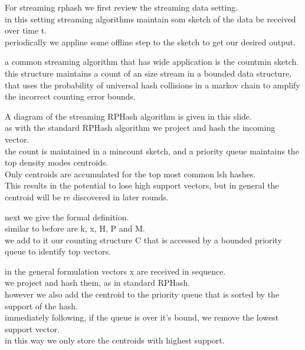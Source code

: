 \documentclass{beamer}
\begin{document}
\begin{frame}[plain]
For streaming rphash we first review the streaming data setting. \\

in this setting
streaming algorithms maintain som sketch of the data be received over time t.\\

periodically we appline some offline step to the sketch to get our desired output.
\end{frame}

\begin{frame}[plain]
a common streaming algorithm that has wide application is the countmin sketch.\\

this structure maintains a count of an size stream in a bounded data structure,
that uses the probability of universal hash collisions in a markov chain to
amplify the incorrect counting error bounds.
\end{frame}

\begin{frame}[plain]
A diagram of the streaming RPHash algorithm is given in this slide.\\

as with the
standard RPHash algorithm we project and hash the incoming vector.\\

the count
is maintained in a mincount sketch, and a priority queue maintains the top
density modes centroids. \\

Only centroids are accumulated for the top most common
lsh hashes. \\

This results in the potential to lose high support vectors, but in
general the centroid will be re discovered in later rounds.
\end{frame}

\begin{frame}[plain]
next we give the formal definition.\\

similar to before are k, x, H, P and M. \\

we add to it our counting structure C
that is accessed by a bounded priority queue to identify top vectors.
\end{frame}

\begin{frame}[plain]
in the general formulation vectors x are received in sequence.\\

we project and hash
them, as in standard RPHash. \\

however we also add the centroid to the priority queue
that is sorted by the support of the hash. \\

immediately following, if the queue is
over it's bound, we remove the lowest support vector. \\

in this way we only store the
centroids with highest support.
\end{frame}
\end{document}
